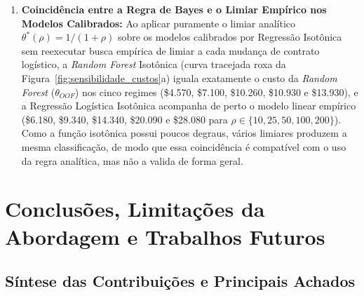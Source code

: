\documentclass[conference]{IEEEtran}
\begin{document}
\begin{enumerate}
    \item \textbf{Coincidência entre a Regra de Bayes e o Limiar Empírico nos Modelos Calibrados:} Ao aplicar puramente o limiar analítico $\theta^*(\rho) = 1/(1+\rho)$ sobre os modelos calibrados por Regressão Isotônica sem reexecutar busca empírica de limiar a cada mudança de contrato logístico, a \textit{Random Forest} Isotônica (curva tracejada roxa da Figura~\ref{fig:sensibilidade_custos}a) iguala exatamente o custo da \textit{Random Forest} ($\theta_{OOF}$) nos cinco regimes (\$4.570, \$7.100, \$10.260, \$10.930 e \$13.930), e a Regressão Logística Isotônica acompanha de perto o modelo linear empírico (\$6.180, \$9.340, \$14.340, \$20.090 e \$28.080 para $\rho \in \{10, 25, 50, 100, 200\}$). Como a função isotônica possui poucos degraus, vários limiares produzem a mesma classificação, de modo que essa coincidência é compatível com o uso da regra analítica, mas não a valida de forma geral.
\end{enumerate}

\section{Conclusões, Limitações da Abordagem e Trabalhos Futuros}
\label{sec:conclusoes}

\subsection{Síntese das Contribuições e Principais Achados}
\end{document}
